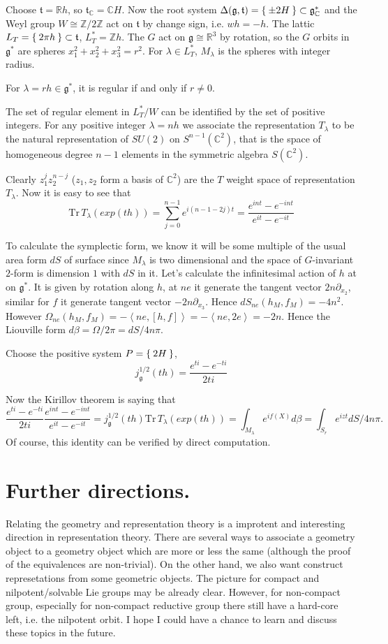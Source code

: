 \documentclass[12pt]{amsart}
\def\bC{{\mathbb{C}}}
\def\bR{{\mathbb{R}}}
\def\bZ{{\mathbb{Z}}}
\def\fgg{{\mathfrak{g}}}
\def\ftt{{\mathfrak{t}}}
\def\bZ{{\mathbb{Z}}}
\def\inn#1#2{\left<{#1},{#2}\right>}
\def\Tr{\mathrm{Tr}}
\begin{document}
Choose $\ftt = \bR h$, so $\ftt_\bC = \bC H$. 
Now the root system $\Delta(\fgg,\ftt) = \Set{\pm 2 H} \subset \fgg_\bC^* $
and the Weyl group $W\cong \bZ/2\bZ$ act on $\ftt$ by change sign, i.e. $wh = -h$. 
The lattic $L_T = \Set{2\pi h} \subset \ftt$, $L_T^* = \bZ h$.
The $G$ act on $\fgg\cong \bR^3$ by rotation, so the $G$ orbits in $\fgg^*$ 
are spheres $x_1^2+x_2^2+x_3^2=r^2$. For $\lambda \in L_T^*$, $M_\lambda$ is the
spheres with integer radius. 

For $\lambda = r h \in \fgg^*$, it is regular if and only if $r \neq 0$.

The set of regular element in $L_T^*/W$ can be identified by the set of positive 
integers. For any positive integer $\lambda = nh$ we associate the representation $T_\lambda$ to be the natural representation of $SU(2)$ on $S^{n-1}(\bC^2)$, that
is the space of homogeneous degree $n-1$ 
elements in the symmetric algebra $S(\bC^2)$. 

Clearly $z_1^{j}z_2^{n-j}$ ($z_1, z_2$ form a basis of $\bC^2$) 
are the $T$ weight space of representation $T_\lambda$.
Now it is easy to see that 
\[
\Tr\, T_\lambda(exp(th)) 
= \sum_{j=0}^{n-1}e^{i(n-1-2j)t} = \frac{e^{int} - e^{-int}}{e^{it}-e^{-it}}
\]

To calculate the symplectic form, we know it will be some multiple of the
usual area form $dS$ of surface since $M_\lambda$ is two dimensional 
and the space of $G$-invariant $2$-form is dimension $1$ with $dS$ in it.
Let's calculate the infinitesimal action of $h$ at on $\fgg^*$. 
It is given by rotation along $h$, at $ne$ it generate the tangent vector 
$2n\partial_{x_2}$, similar for $f$ it generate tangent vector 
$-2n\partial_{x_3}$. Hence $dS_{ne}(h_M,f_M) = -4n^2$. 
However $\Omega_{ne}(h_M,f_M) = -\inn{ne}{[h,f]} = -\inn{ne}{2e} = -2n$.
Hence the Liouville form $d\beta = \Omega/2\pi = dS/4n\pi$.

Choose the positive system $P = \Set{2H}$, 
\[
j_\fgg^{1/2}(th) = \frac{e^{ti}-e^{-ti}}{2ti}
\]

Now the Kirillov theorem is saying that 
\[
\frac{e^{ti}-e^{-ti}}{2ti} \frac{e^{int} - e^{-int}}{e^{it}-e^{-it}}
=  j_\fgg^{1/2}(th)\Tr\, T_\lambda(exp(th)) 
= \int_{M_\lambda}e^{if(X)}d\beta
= \int_{S_r}e^{i zt}dS/4n\pi.
\]
Of course, this identity can be verified by direct computation.

\section{Further directions.}
Relating the geometry and representation theory is a improtent and interesting 
direction in representation theory. There are several ways to associate 
a geometry object to a geometry object which are more or less the same 
(although the proof of the equivalences are non-trivial).
On the other hand, we also want construct represetations from some geometric 
objects.
The picture for compact and nilpotent/solvable Lie groups 
may be already clear. However, 
for non-compact group, especially for non-compact reductive group there still 
have a hard-core left, i.e. the nilpotent orbit. 
I hope I could have a chance to learn and discuss these topics in the future.



\end{document}
